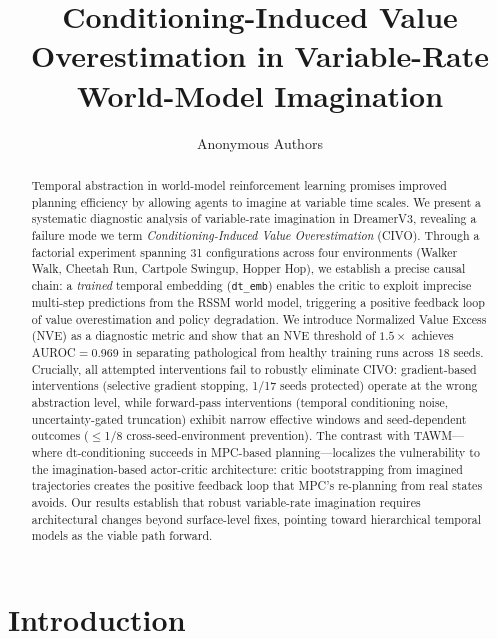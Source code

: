 \documentclass[letterpaper]{article}
\title{Conditioning-Induced Value Overestimation in Variable-Rate World-Model Imagination}
\author{
Anonymous Authors
}
\date{}
\newcommand{\civo}{CIVO\xspace}
\newcommand{\nve}{NVE\xspace}
\newcommand{\dtemb}{\texttt{dt\_emb}\xspace}
\begin{document}
\maketitle

\begin{abstract}
Temporal abstraction in world-model reinforcement learning promises improved planning efficiency by allowing agents to imagine at variable time scales. We present a systematic diagnostic analysis of variable-rate imagination in DreamerV3, revealing a failure mode we term \emph{Conditioning-Induced Value Overestimation} (\civo). Through a factorial experiment spanning 31 configurations across four environments (Walker Walk, Cheetah Run, Cartpole Swingup, Hopper Hop), we establish a precise causal chain: a \emph{trained} temporal embedding (\dtemb) enables the critic to exploit imprecise multi-step predictions from the RSSM world model, triggering a positive feedback loop of value overestimation and policy degradation. We introduce Normalized Value Excess (\nve) as a diagnostic metric and show that an \nve threshold of $1.5\times$ achieves AUROC$=$0.969 in separating pathological from healthy training runs across 18 seeds. Crucially, all attempted interventions fail to robustly eliminate \civo: gradient-based interventions (selective gradient stopping, 1/17 seeds protected) operate at the wrong abstraction level, while forward-pass interventions (temporal conditioning noise, uncertainty-gated truncation) exhibit narrow effective windows and seed-dependent outcomes ($\leq$1/8 cross-seed-environment prevention). The contrast with TAWM---where dt-conditioning succeeds in MPC-based planning---localizes the vulnerability to the imagination-based actor-critic architecture: critic bootstrapping from imagined trajectories creates the positive feedback loop that MPC's re-planning from real states avoids. Our results establish that robust variable-rate imagination requires architectural changes beyond surface-level fixes, pointing toward hierarchical temporal models as the viable path forward.
\end{abstract}

\section{Introduction}
\end{document}
